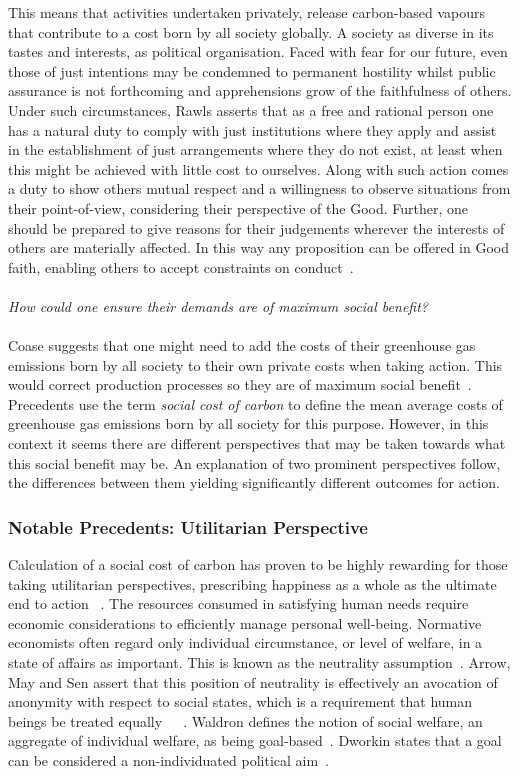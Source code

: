 \documentclass[11pt, oneside]{article}   	%
\begin{document}
This means that activities undertaken privately, release carbon-based vapours that contribute to a cost born by all society globally.
A society as diverse in its tastes and interests, as political organisation.
Faced with fear for our future, even those of just intentions may be condemned to permanent hostility whilst public assurance is not forthcoming and apprehensions grow of the faithfulness of others.
Under such circumstances, Rawls asserts that as a free and rational person one has a natural duty to comply with just institutions where they apply and assist in the establishment of just arrangements where they do not exist, at least when this might be achieved with little cost to ourselves.
Along with such action comes a duty to show others mutual respect and a willingness to observe situations from their point-of-view, considering their perspective of the Good.
Further, one should be prepared to give reasons for their judgements wherever the interests of others are materially affected. In this way any proposition can be offered in Good faith, enabling others to accept constraints on conduct~\cite{jr1}.\\
\\
 \emph{How could one ensure their demands are of maximum social benefit?}\\
 \\
Coase suggests that one might need to add the costs of their greenhouse gas emissions born by all society to their own private costs when taking action.
This would correct production processes so they are of maximum social benefit~\cite{rc1}.
Precedents use the term \emph{social cost of carbon} to define the mean average costs of greenhouse gas emissions born by all society for this purpose.
However, in this context it seems there are different perspectives that may be taken towards what this social benefit may be.
An explanation of two prominent perspectives follow, the differences between them yielding significantly different outcomes for action.

\subsubsection{Notable Precedents: Utilitarian Perspective}

Calculation of a social cost of carbon has proven to be highly rewarding for those taking utilitarian perspectives, prescribing happiness as a whole as the ultimate end to action ~\cite{hs1}. The resources consumed in satisfying human needs require economic considerations to efficiently manage personal well-being. Normative economists often regard only individual circumstance, or level of  welfare, in a state of affairs as important. This is known as the neutrality assumption~\cite{pd2}. Arrow, May and Sen assert that this position of neutrality is effectively an avocation of anonymity with respect to social states, which is a requirement that human beings be treated equally~\cite{ka1}~\cite{km1}~\cite{as2}. Waldron defines the notion of social welfare, an aggregate of individual welfare, as being goal-based~\cite{jw2}. Dworkin states that a goal can be considered a non-individuated political aim~\cite{rd1}.
\end{document}
